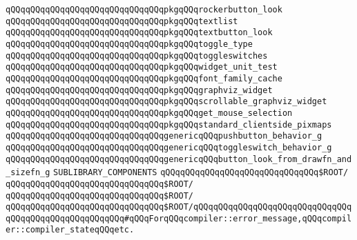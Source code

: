 \verb|qQQqqQQqqQQqqQQqqQQqqQQqqQQqqQQqpkgqQQqrockerbutton_look|\newline
\verb|qQQqqQQqqQQqqQQqqQQqqQQqqQQqqQQqpkgqQQqtextlist|\newline
\verb|qQQqqQQqqQQqqQQqqQQqqQQqqQQqqQQqpkgqQQqtextbutton_look|\newline
\verb|qQQqqQQqqQQqqQQqqQQqqQQqqQQqqQQqpkgqQQqtoggle_type|\newline
\verb|qQQqqQQqqQQqqQQqqQQqqQQqqQQqqQQqpkgqQQqtoggleswitches|\newline
\verb|qQQqqQQqqQQqqQQqqQQqqQQqqQQqqQQqpkgqQQqwidget_unit_test|\newline
\verb|qQQqqQQqqQQqqQQqqQQqqQQqqQQqqQQqpkgqQQqfont_family_cache|\newline
\verb|qQQqqQQqqQQqqQQqqQQqqQQqqQQqqQQqpkgqQQqgraphviz_widget|\newline
\verb|qQQqqQQqqQQqqQQqqQQqqQQqqQQqqQQqpkgqQQqscrollable_graphviz_widget|\newline
\verb|qQQqqQQqqQQqqQQqqQQqqQQqqQQqqQQqpkgqQQqget_mouse_selection|\newline
\verb|qQQqqQQqqQQqqQQqqQQqqQQqqQQqqQQqpkgqQQqstandard_clientside_pixmaps|\newline
\newline
\newline
\verb|qQQqqQQqqQQqqQQqqQQqqQQqqQQqqQQqgenericqQQqpushbutton_behavior_g|\newline
\verb|qQQqqQQqqQQqqQQqqQQqqQQqqQQqqQQqgenericqQQqtoggleswitch_behavior_g|\newline
\verb|qQQqqQQqqQQqqQQqqQQqqQQqqQQqqQQqgenericqQQqbutton_look_from_drawfn_and_sizefn_g|\newline
\newline
\newline
\newline
\verb|SUBLIBRARY_COMPONENTS|\newline
\newline
\verb|qQQqqQQqqQQqqQQqqQQqqQQqqQQqqQQq$ROOT/|\newline
\verb|qQQqqQQqqQQqqQQqqQQqqQQqqQQqqQQq$ROOT/|\newline
\verb|qQQqqQQqqQQqqQQqqQQqqQQqqQQqqQQq$ROOT/|\newline
\verb|qQQqqQQqqQQqqQQqqQQqqQQqqQQqqQQq$ROOT/|\verb|qQQqqQQqqQQqqQQqqQQqqQQqqQQqqQQqqQQqqQQqqQQqqQQqqQQqqQQq#qQQqForqQQqcompiler::error_message,qQQqcompiler::compiler_stateqQQqetc.|\newline
